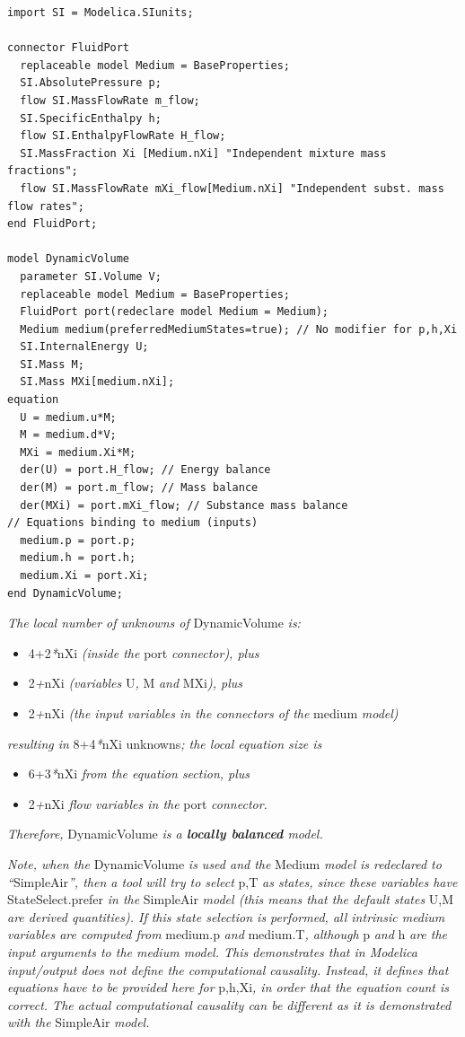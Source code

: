 \documentclass[10pt,a4paper]{report}
\begin{document}
\begin{lstlisting}[language=modelica]
import SI = Modelica.SIunits;

connector FluidPort
  replaceable model Medium = BaseProperties;
  SI.AbsolutePressure p;
  flow SI.MassFlowRate m_flow;
  SI.SpecificEnthalpy h;
  flow SI.EnthalpyFlowRate H_flow;
  SI.MassFraction Xi [Medium.nXi] "Independent mixture mass fractions";
  flow SI.MassFlowRate mXi_flow[Medium.nXi] "Independent subst. mass flow rates";
end FluidPort;

model DynamicVolume
  parameter SI.Volume V;
  replaceable model Medium = BaseProperties;
  FluidPort port(redeclare model Medium = Medium);
  Medium medium(preferredMediumStates=true); // No modifier for p,h,Xi
  SI.InternalEnergy U;
  SI.Mass M;
  SI.Mass MXi[medium.nXi];
equation
  U = medium.u*M;
  M = medium.d*V;
  MXi = medium.Xi*M;
  der(U) = port.H_flow; // Energy balance
  der(M) = port.m_flow; // Mass balance
  der(MXi) = port.mXi_flow; // Substance mass balance
// Equations binding to medium (inputs)
  medium.p = port.p;
  medium.h = port.h;
  medium.Xi = port.Xi;
end DynamicVolume;
\end{lstlisting}

\emph{The local number of unknowns of} DynamicVolume \emph{is:}

\begin{itemize}
\item
  4+2\emph{*}nXi \emph{(inside the} port \emph{connector), plus}
\item
  2\emph{+}nXi \emph{(variables} U\emph{,} M \emph{and} MXi\emph{),
  plus}
\item
  2\emph{+}nXi \emph{(the input variables in the connectors of the}
  medium \emph{model)}
\end{itemize}

\emph{resulting in} 8+4\emph{*}nXi unknowns\emph{; the local equation
size is }

\begin{itemize}
\item
  6+3\emph{*}nXi \emph{from the equation section, plus}
\item
  2\emph{+}nXi \emph{flow variables in the} port \emph{connector. }
\end{itemize}

\emph{Therefore,} DynamicVolume \emph{is a \textbf{locally balanced}
model.}

\emph{Note, when the} DynamicVolume \emph{is used and the} Medium
\emph{model is redeclared to ``}SimpleAir\emph{'', then a tool will try
to select} p,T \emph{as states, since these variables have}
StateSelect.prefer \emph{in the} SimpleAir \emph{model (this means that
the default states} U,M \emph{are derived quantities). If this state
selection is performed, all intrinsic medium variables are computed
from} medium.p \emph{and} medium.T\emph{, although} p \emph{and} h
\emph{are the input arguments to the medium model. This demonstrates
that in Modelica input/output does not define the computational
causality. Instead, it defines that equations have to be provided here
for} p,h,Xi\emph{, in order that the equation count is correct. The
actual computational causality can be different as it is demonstrated
with the} SimpleAir \emph{model.}
\end{document}
